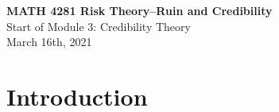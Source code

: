 \documentclass[11pt]{beamer}
\begin{document}
\begin{frame}
  \frametitle{}
  \begin{center}
    \textbf{\large MATH 4281 Risk Theory--Ruin and Credibility}\\
    \vspace{1cm}
    {\large  Start of Module 3: Credibility Theory} \\
    \vspace{1cm}
    {\large  March 16th, 2021}
    \end{center}
    \vspace{1cm}
\end{frame}
\begin{frame}
\tableofcontents
\end{frame}
\section{Introduction}
\end{document}
